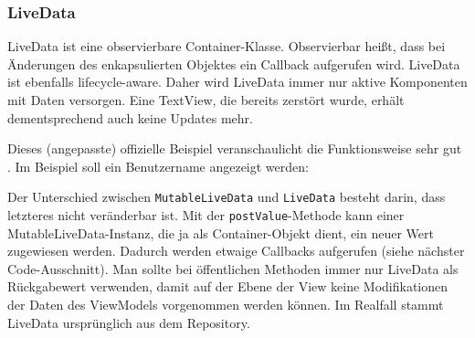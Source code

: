 \hypertarget{livedata}{%
\subsubsection{LiveData}\label{livedata}}

LiveData ist eine observierbare Container-Klasse. Observierbar heißt,
dass bei Änderungen des enkapsulierten Objektes ein Callback aufgerufen
wird. LiveData ist ebenfalls lifecycle-aware. Daher wird LiveData immer
nur aktive Komponenten mit Daten versorgen. Eine TextView, die bereits
zerstört wurde, erhält dementsprechend auch keine Updates mehr.

Dieses (angepasste) offizielle Beispiel veranschaulicht die
Funktionsweise sehr gut \cite{livedata}. Im Beispiel soll ein
Benutzername angezeigt werden:

\begin{Shaded}
\begin{Highlighting}[]
 


    \NormalTok{> }\NormalTok{() \{}
        \NormalTok{) \{}
\NormalTok{        \}}
\NormalTok{(}\NormalTok{);}

\NormalTok{    \}}

\NormalTok{\}}
\end{Highlighting}
\end{Shaded}

Der Unterschied zwischen \texttt{MutableLiveData} und \texttt{LiveData}
besteht darin, dass letzteres nicht veränderbar ist. Mit der
\texttt{postValue}-Methode kann einer MutableLiveData-Instanz, die ja
als Container-Objekt dient, ein neuer Wert zugewiesen werden. Dadurch
werden etwaige Callbacks aufgerufen (siehe nächster Code-Ausschnitt).
Man sollte bei öffentlichen Methoden immer nur LiveData als Rückgabewert
verwenden, damit auf der Ebene der View keine Modifikationen der Daten
des ViewModels vorgenommen werden können. Im Realfall stammt LiveData
ursprünglich aus dem Repository.

